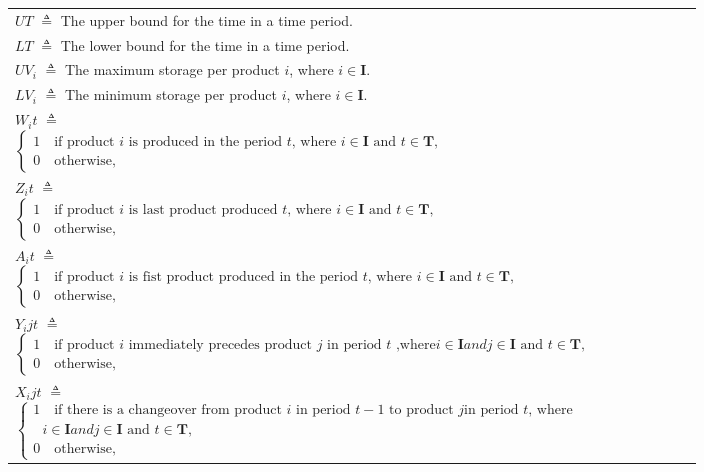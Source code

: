 \documentclass[a4paper,11pt,fleqn]{report}
\begin{document}
\begin{tabular}{l c p{0.8\linewidth}}
                $UT$ $\triangleq$ The upper bound for the time in a time period.\\
                $LT$ $\triangleq$ The lower bound for the time in a time period.\\
                $UV_i$ $\triangleq$ The maximum storage per product $i$, where $i \in \pmb{I}$.\\
                $LV_i$ $\triangleq$ The minimum storage per product $i$, where $i \in \pmb{I}$.\\
                $W_it$ $\triangleq$ $\begin{cases}
                                          1 \quad \text{if product } i \text{ is produced in the period } t \text{, where } i\in \pmb{I} \text{ and } t\in \pmb{T},\\
                                          0 \quad \text{otherwise},
                            \end{cases}$\\
                $Z_it$ $\triangleq$ $\begin{cases}
                                          1 \quad \text{if product } i \text{ is last product produced } t \text{, where } i\in \pmb{I} \text{ and } t\in \pmb{T},\\
                                          0 \quad \text{otherwise},
                            \end{cases}$\\
                $A_it$ $\triangleq$ $\begin{cases}
                                          1 \quad \text{if product } i \text{ is fist product produced in the period } t \text{, where } i\in \pmb{I} \text{ and } t\in \pmb{T},\\
                                          0 \quad \text{otherwise},
                            \end{cases}$\\
                $Y_ijt$ $\triangleq$ $\begin{cases}
                                          1 \quad \text{if product } i \text{ immediately precedes product } j \text{ in period $t$ ,where} i\in \pmb{I} and j\in \pmb{I} \text{ and } t\in \pmb{T},\\
                                          0 \quad \text{otherwise},
                            \end{cases}$\\
                $X_ijt$ $\triangleq$ $\begin{cases}
                                          1 \quad \text{if there is a changeover from product  } i \text{ in period } t-1 \text{ to product }  j \text{in period } t \text{, where}\\
                                          \text{    }i\in \pmb{I} and j\in \pmb{I} \text{ and } t\in \pmb{T},\\
                                          0 \quad \text{otherwise},
                            \end{cases}$\\
            \end{tabular}
           
\end{document}
